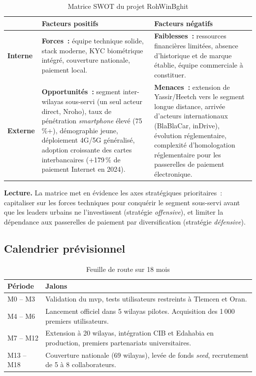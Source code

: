\documentclass[12pt, a4paper, oneside]{report}
\begin{document}
\begin{table}[H]
\centering
\begin{tabularx}{\textwidth}{|>{\columncolor{rohlight}}l|X|X|}
\hline
 & \textbf{Facteurs positifs} & \textbf{Facteurs négatifs} \\
\hline
\textbf{Interne} & \textbf{Forces~:} équipe technique solide, stack moderne, KYC biométrique intégré, couverture nationale, paiement local. & \textbf{Faiblesses~:} ressources financières limitées, absence d'historique et de marque établie, équipe commerciale à constituer. \\
\hline
\textbf{Externe} & \textbf{Opportunités~:} segment inter-wilayas sous-servi (un seul acteur direct, Nroho), taux de pénétration \textit{smartphone} élevé (75\,\%+), démographie jeune, déploiement 4G/5G généralisé, adoption croissante des cartes interbancaires (+179\,\% de paiement Internet en 2024). & \textbf{Menaces~:} extension de Yassir/Heetch vers le segment longue distance, arrivée d'acteurs internationaux (BlaBlaCar, inDrive), évolution réglementaire, complexité d'homologation réglementaire pour les passerelles de paiement électronique. \\
\hline
\end{tabularx}
  \caption{Matrice SWOT du projet RohWinBghit}
\end{table}


\textbf{Lecture.} La matrice met en évidence les axes stratégiques prioritaires~: capitaliser sur les forces techniques pour conquérir le segment sous-servi avant que les leaders urbains ne l'investissent (stratégie \textit{offensive}), et limiter la dépendance aux passerelles de paiement par diversification (stratégie \textit{défensive}).

\subsection{Calendrier prévisionnel}

\begin{table}[H]
\centering
\begin{tabularx}{\textwidth}{|l|X|}
\hline
\rowcolor{rohlight}
\textbf{Période} & \textbf{Jalons} \\
\hline
M0 -- M3 & Validation du \gls{mvp}, tests utilisateurs restreints à Tlemcen et Oran. \\
\hline
M4 -- M6 & Lancement officiel dans 5 wilayas pilotes. Acquisition des 1\,000 premiers utilisateurs. \\
\hline
M7 -- M12 & Extension à 20 wilayas, intégration CIB et Edahabia en production, premiers partenariats universitaires. \\
\hline
M13 -- M18 & Couverture nationale (69 wilayas), levée de fonds \textit{seed}, recrutement de 5 à 8 collaborateurs. \\
\hline
\end{tabularx}
  \caption{Feuille de route sur 18 mois}
\end{table}
\end{document}

